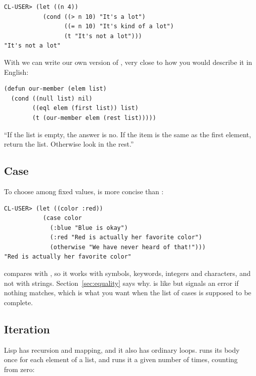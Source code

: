 \begin{verbatim}
CL-USER> (let ((n 4))
           (cond ((> n 10) "It's a lot")
                 ((= n 10) "It's kind of a lot")
                 (t "It's not a lot")))
"It's not a lot"
\end{verbatim}

With  we can write our own version of , very
close to how you would describe it in English:

\begin{verbatim}
(defun our-member (elem list)
  (cond ((null list) nil)
        ((eql elem (first list)) list)
        (t (our-member elem (rest list)))))
\end{verbatim}

``If the list is empty, the answer is no. If the item is the same as
the first element, return the list. Otherwise look in the rest.''

\subsection{Case}

To choose among fixed values,  is more concise than
:

\begin{verbatim}
CL-USER> (let ((color :red))
           (case color
             (:blue "Blue is okay")
             (:red "Red is actually her favorite color")
             (otherwise "We have never heard of that!")))
"Red is actually her favorite color"
\end{verbatim}

 compares with , so it works with symbols,
keywords, integers and characters, and not with strings.
Section~\ref{sec:equality} says why.  is like
 but signals an error if nothing matches, which is what
you want when the list of cases is supposed to be complete.

\subsection{Iteration}

Lisp has recursion and mapping, and it also has ordinary loops.
 runs its body once for each element of a list, and
 runs it a given number of times, counting from zero:

